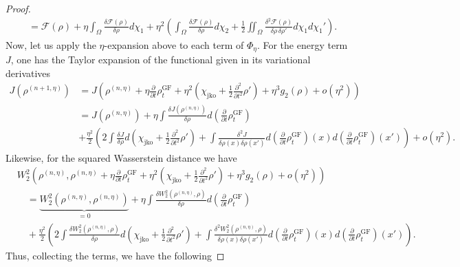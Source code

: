 \documentclass[reqno,11pt,letterpaper]{amsart}
\theoremstyle{plain}
\theoremstyle{definition}
\theoremstyle{remark}
\newcommand{\wass}{\mathrm{GF}}
\newcommand{\jkoreg}{\chi_{\mathrm{jko}}}
\begin{document}
\begin{proof}
\begin{align*}
&=\mathcal{F}(\rho) +
\eta\int_{\Omega} \frac{\delta \mathcal{F}(\rho)}{\delta\rho} d\chi_{1} + 
\eta^{2} \left( \int_{\Omega} \frac{\delta \mathcal{F}(\rho)}{\delta\rho} d \chi_{2} + \frac{1}{2}\iint_{\Omega}\frac{\delta^{2} \mathcal{F}(\rho)}{\delta\rho \,\delta\rho'} d\chi_{1}  d\chi_{1}' \right).
\end{align*}
Now, let us apply the $\eta$-expansion above to each term of $\Phi_{\eta}$. For the energy term $J$, one has the Taylor expansion of the functional given in its variational derivatives
\begin{align*}
J(\rho^{(n+1, \eta)}) &= J\left(\rho^{(n,\eta)} + \eta \frac{\partial }{\partial t} \rho^{\wass}_{t} + \eta^{2} \left( \jkoreg + \frac{1}{2} \frac{\partial^{2} }{\partial t^{2}} \rho'  \right) + \eta^{3} g_{2}(\rho) + o(\eta^{2}) \right) \\
&= J(\rho^{(n,\eta)}) + \eta \int \frac{\delta J (\rho^{(n,\eta)})}{\delta \rho} d\left(\frac{\partial }{\partial t} \rho^{\wass}_{t}\right) \\  &+
\frac{\eta^{2}}{2} \left(
2\int \frac{\delta J}{ \delta \rho} d\left( \jkoreg + \frac{1}{2} \frac{\partial^{2} }{\partial t^{2}} \rho'
\right) +
\int \frac{\delta^{2} J}{ \delta \rho(x) \delta \rho(x')} d\left(\frac{\partial }{\partial t} \rho^{\wass}_{t}\right)(x)d\left(\frac{\partial }{\partial t} \rho^{\wass}_{t}\right)(x') 
\right)
+ o(\eta^{2}).
\end{align*}
Likewise, for the squared Wasserstein distance we have
\begin{align*}
&W_{2}^{2}\left(\rho^{(n, \eta)}, \rho^{(n,\eta)} + \eta \frac{\partial }{\partial t} \rho^{\wass}_{t} + \eta^{2} \left( \jkoreg + \frac{1}{2} \frac{\partial^{2} }{\partial t^{2}} \rho'  \right) + \eta^{3} g_{2}(\rho) + o(\eta^{2})  \right) \\
& \quad = \underbrace{W_{2}^{2}(\rho^{(n, \eta)}, \rho^{(n, \eta)})}_{=0} + \eta \int \frac{\delta W_{2}^{2} (\rho^{(n,\eta)}, \rho)}{\delta \rho} d\left(\frac{\partial }{\partial t} \rho^{\wass}_{t}\right) \\
&\quad  + \frac{\eta^{2}}{2} \left(
2 \int \frac{\delta W_{2}^{2}(\rho^{(n, \eta)}, \rho)}{ \delta \rho} d\left( \jkoreg + \frac{1}{2} \frac{\partial^{2} }{\partial t^{2}} \rho'
\right) +
\int \frac{\delta^{2} W_{2}^{2}(\rho^{(n, \eta)}, \rho)}{ \delta \rho(x) \delta \rho(x')} d\left(\frac{\partial }{\partial t} \rho^{\wass}_{t}\right)(x)d\left(\frac{\partial }{\partial t} \rho^{\wass}_{t}\right)(x') 
\right).
\end{align*}
Thus, collecting the terms, we have the following

\end{proof}
\end{document}
